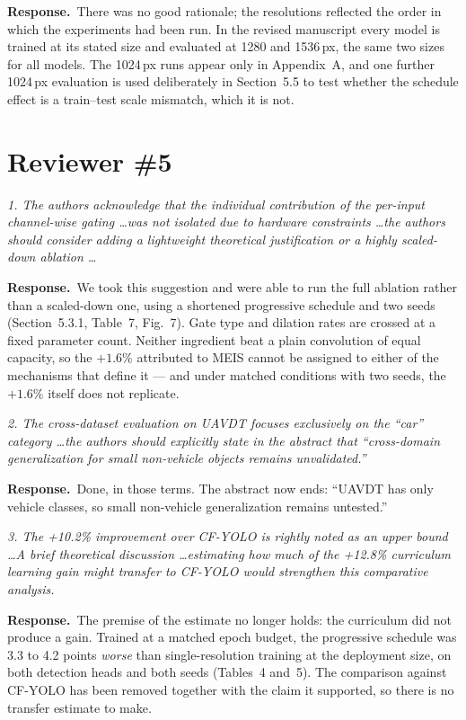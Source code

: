 \documentclass[11pt, a4paper]{article}
\newcommand{\point}[1]{\medskip\noindent\textit{#1}\par}
\newcommand{\reply}{\textbf{Response.}\ }
\begin{document}
\reply There was no good rationale; the resolutions reflected the order in which
the experiments had been run. In the revised manuscript every model is trained at
its stated size and evaluated at 1280 and 1536\,px, the same two sizes for all
models. The 1024\,px runs appear only in Appendix~A, and one further 1024\,px
evaluation is used deliberately in Section~5.5 to test whether the schedule effect
is a train--test scale mismatch, which it is not.

\section*{Reviewer \#5}

\point{1. The authors acknowledge that the individual contribution of the
per-input channel-wise gating \dots was not isolated due to hardware constraints
\dots the authors should consider adding a lightweight theoretical justification
or a highly scaled-down ablation \dots}

\reply We took this suggestion and were able to run the full ablation rather than
a scaled-down one, using a shortened progressive schedule and two seeds
(Section~5.3.1, Table~7, Fig.~7). Gate type and dilation rates are crossed at a
fixed parameter count. Neither ingredient beat a plain convolution of equal
capacity, so the $+1.6\%$ attributed to MEIS cannot be assigned to either of the
mechanisms that define it --- and under matched conditions with two seeds, the
$+1.6\%$ itself does not replicate.

\point{2. The cross-dataset evaluation on UAVDT focuses exclusively on the ``car''
category \dots the authors should explicitly state in the abstract that
``cross-domain generalization for small non-vehicle objects remains unvalidated.''}

\reply Done, in those terms. The abstract now ends: ``UAVDT has only vehicle
classes, so small non-vehicle generalization remains untested.''

\point{3. The +10.2\% improvement over CF-YOLO is rightly noted as an upper bound
\dots A brief theoretical discussion \dots estimating how much of the +12.8\%
curriculum learning gain might transfer to CF-YOLO would strengthen this
comparative analysis.}

\reply The premise of the estimate no longer holds: the curriculum did not
produce a gain. Trained at a matched epoch budget, the progressive schedule was
3.3 to 4.2 points \emph{worse} than single-resolution training at the deployment
size, on both detection heads and both seeds (Tables~4 and~5). The comparison
against CF-YOLO has been removed together with the claim it supported, so there is
no transfer estimate to make.
\end{document}
